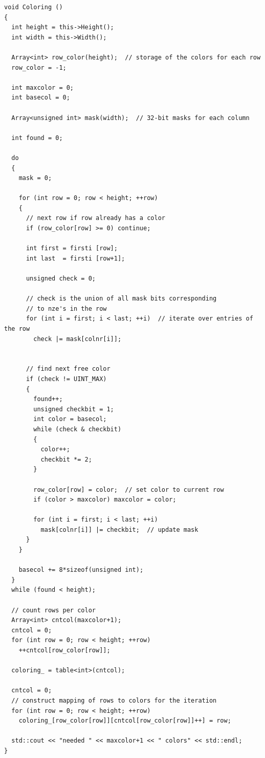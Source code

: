 \documentclass[a4paper,11pt]{scrartcl}
\begin{document}
\begin{lstlisting}
void Coloring ()
{
  int height = this->Height();
  int width = this->Width();

  Array<int> row_color(height);  // storage of the colors for each row
  row_color = -1;

  int maxcolor = 0;
  int basecol = 0;

  Array<unsigned int> mask(width);  // 32-bit masks for each column

  int found = 0;

  do
  {
    mask = 0;

    for (int row = 0; row < height; ++row)
    {
      // next row if row already has a color
      if (row_color[row] >= 0) continue;

      int first = firsti [row];
      int last  = firsti [row+1];

      unsigned check = 0;

      // check is the union of all mask bits corresponding
      // to nze's in the row
      for (int i = first; i < last; ++i)  // iterate over entries of the row
        check |= mask[colnr[i]];


      // find next free color
      if (check != UINT_MAX)
      {
        found++;
        unsigned checkbit = 1;
        int color = basecol;
        while (check & checkbit)
        {
          color++;
          checkbit *= 2;
        }

        row_color[row] = color;  // set color to current row
        if (color > maxcolor) maxcolor = color;

        for (int i = first; i < last; ++i)
          mask[colnr[i]] |= checkbit;  // update mask
      }
    }

    basecol += 8*sizeof(unsigned int);
  }
  while (found < height);

  // count rows per color
  Array<int> cntcol(maxcolor+1);
  cntcol = 0;
  for (int row = 0; row < height; ++row)
    ++cntcol[row_color[row]];

  coloring_ = table<int>(cntcol);

  cntcol = 0;
  // construct mapping of rows to colors for the iteration
  for (int row = 0; row < height; ++row)
    coloring_[row_color[row]][cntcol[row_color[row]]++] = row;

  std::cout << "needed " << maxcolor+1 << " colors" << std::endl;
}

\end{lstlisting}
\end{document}
